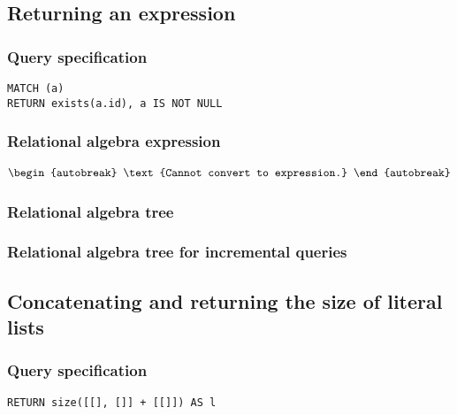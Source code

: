 
\subsection{Returning an expression}

\subsubsection*{Query specification}

\begin{lstlisting}
MATCH (a)
RETURN exists(a.id), a IS NOT NULL
\end{lstlisting}

\subsubsection*{Relational algebra expression}

\begin{align*}
\begin{autobreak}
\text{Cannot convert to expression.}
\end{autobreak}
\end{align*}

\subsubsection*{Relational algebra tree}


\subsubsection*{Relational algebra tree for incremental queries}


\subsection{Concatenating and returning the size of literal lists}

\subsubsection*{Query specification}

\begin{lstlisting}
RETURN size([[], []] + [[]]) AS l
\end{lstlisting}

